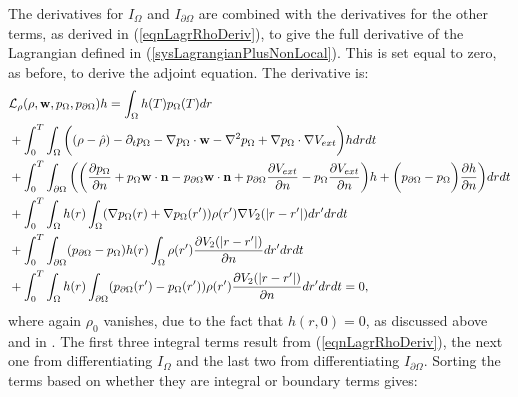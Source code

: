 The derivatives for $I_{\Omega}$ and $I_{\partial \Omega}$ are combined with the derivatives for the other terms, as derived in (\ref{eqnLagrRhoDeriv}), to give the full derivative of the Lagrangian defined in (\ref{sysLagrangianPlusNonLocal}). This is set equal to zero, as before, to derive the adjoint equation. The derivative is:
\begin{align*}
&\mathcal{L}_\rho (\rho,\mathbf{w},p_\Omega,p_{\partial \Omega})h=
\int_\Omega h(T) p_\Omega(T) dr\\
&+ \int_0^T \int_\Omega \bigg( (\rho- \hat{\rho})   - \partial_t  p_\Omega  - \nabla p_\Omega \cdot \mathbf{w}  - \nabla^2 p_\Omega \notag 
+  \nabla p_\Omega\cdot \nabla V_{ext} \bigg)h dr dt  \notag \\
& +  \int_0^T\int_{\partial \Omega}  \bigg(
\bigg(\frac{\partial p_\Omega }{\partial n} + p_\Omega \mathbf{w} \cdot \mathbf{n} - p_{\partial \Omega} \mathbf{w} \cdot \mathbf{n}  +  p_{\partial \Omega} \dfrac{\partial V_{ext}}{\partial n} - p_\Omega \frac{\partial V_{ext}}{\partial n} \bigg)h \notag
+ \bigg( p_{\partial \Omega}- p_\Omega \bigg) \frac{\partial h}{\partial n} \bigg) dr dt \\
&+ \int_0^T \int_\Omega  h(r) \int_\Omega (\nabla  p_\Omega(r)+\nabla  p_\Omega(r')) \rho(r') \nabla V_2(|r-r'|) dr' dr dt \\
&+\int_0^T \int_{\partial \Omega} ( p_{\partial \Omega} - p_\Omega) h(r)  \int_\Omega \rho(r') \frac{\partial V_2(|r-r'|)}{\partial n} dr' dr dt \\
&+ \int_0^T \int_\Omega h(r)\int_{\partial \Omega} ( p_{\partial \Omega}(r') - p_\Omega(r')) \rho(r')   \frac{\partial V_2(|r-r'|)}{\partial n} dr' dr dt
=0,
\end{align*}
where again $\rho_0$ vanishes, due to the fact that $h(r,0)=0$, as discussed above and in \cite{TroeltzschFredi2010OCoP}.
The first three integral terms result from (\ref{eqnLagrRhoDeriv}), the next one from differentiating $I_\Omega$ and the last two from differentiating $I_{\partial \Omega}$.
Sorting the terms based on whether they are integral or boundary terms gives:
